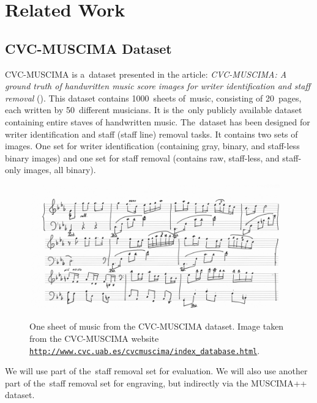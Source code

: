 \chapter{Related Work}
\label{chap:RelatedWork}


\section{CVC-MUSCIMA Dataset}
\label{sec:CvcMuscima}

CVC-MUSCIMA is a~dataset presented in the article: \emph{CVC-MUSCIMA: A ground truth of handwritten music score images for writer identification and staff removal} (\cite{CvcMuscima}). This dataset contains 1000~sheets of~music, consisting of 20~pages, each written by 50~different musicians. It is the~only publicly available dataset containing entire staves of handwritten music. The~dataset has been designed for writer identification and staff (staff line) removal tasks. It contains two sets of images. One set for writer identification (containing gray, binary, and staff-less binary images) and one set for staff removal (contains raw, staff-less, and staff-only images, all binary).

\begin{figure}[h]
    \centering
    \includegraphics[width=140mm]{../img/cvc-muscima}
    \caption{One sheet of music from the CVC-MUSCIMA dataset. Image taken from the CVC-MUSCIMA website \href{http://www.cvc.uab.es/cvcmuscima/index_database.html}{\texttt{http://www.cvc.uab.es/{\allowbreak}cvc{\allowbreak}muscima/{\allowbreak}index\_database.html}}.}
    \label{fig2:CvcMuscima}
\end{figure}

We will use part of the~staff removal set for evaluation. We will also use another part of the~staff removal set for engraving, but indirectly via the MUSCIMA++ dataset.



